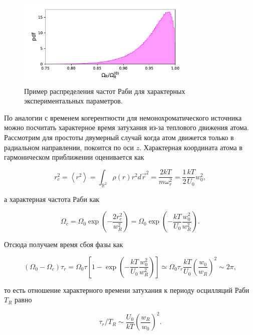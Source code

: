 \begin{figure}[H]
	\centering
	\includegraphics[width=0.75\textwidth]{images/non_monochromatic.pdf}
	\caption{Пример распределения частот Раби для характерных экспериментальных параметров.}
	\label{fig:non_monochromatic}
\end{figure}

По аналогии с временем когерентности для немонохроматического источника можно посчитать характерное время затухания из-за теплового движения атома. Рассмотрим для простоты двумерный случай когда атом движется только в радиальном направлении, покоится по оси $z$. Характерная координата атома в гармоническом приближении оценивается как

\begin{equation}
	r_c^2=\left< r^2\right> = \int_{\mathbb{R}^2} \rho(r)r^2 d\vec{r}^2 = \frac{2kT}{m\omega_r^2} = \frac{1}{2}\frac{kT}{U_0}w_0^2,
\end{equation}

а характерная частота Раби как

\begin{equation}
	\Omega_{c} = \Omega_0 \exp\left(-\frac{2r^2_c}{w_R^2}\right)=\Omega_0 \exp\left(-\frac{kT}{U_0}\frac{w_0^2}{w_R^2}\right).
\end{equation}

Отсюда получаем время сбоя фазы как 

\begin{equation}
	(\Omega_0 - \Omega_c)\tau_{r} = \Omega_0 \tau\left[1 - \exp\left(-\frac{kT}{U_0}\frac{w_0^2}{w_R^2}\right)\right] \simeq \Omega_0 \tau_r \frac{kT}{U_0}\left(\frac{w_0}{w_R}\right)^2 \sim 2\pi,
\end{equation}

то есть отношение характерного времени затухания к периоду осцилляций Раби $T_{R}$ равно

\begin{equation}
	\tau_{r}/T_{R} \sim \frac{U_0}{kT}\left(\frac{w_R}{w_0}\right)^2.
\end{equation}

